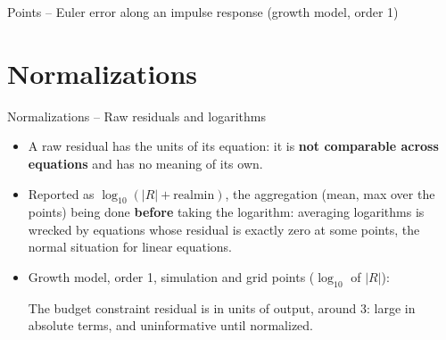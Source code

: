 \documentclass[11pt,aspectratio=169]{beamer}
\begin{document}
\begin{frame}{Points -- Euler error along an impulse response (growth model, order 1)}

\begin{center}
\end{center}

\end{frame}

\section{Normalizations}

\begin{frame}{Normalizations -- Raw residuals and logarithms}

\begin{itemize}

\item A raw residual has the units of its equation: it is \textbf{not comparable across equations} and has no meaning of its own.\newline

\item Reported as $\log_{10}(|R|+\text{realmin})$, the aggregation (mean, max over the points) being done \textbf{before} taking the logarithm: averaging logarithms is wrecked by equations whose residual is exactly zero at some points, the normal situation for linear equations.\newline

\item Growth model, order 1, simulation and grid points ($\log_{10}$ of $|R|$):
\begin{center}
\small

\end{center}
The budget constraint residual is in units of output, around 3: large in absolute terms, and uninformative until normalized.

\end{itemize}

\end{frame}
\end{document}
